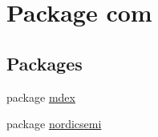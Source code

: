 \hypertarget{namespacecom}{}\section{Package com}
\label{namespacecom}
\subsection*{Packages}
\begin{DoxyCompactItemize}
\item 
package \hyperlink{namespacecom_1_1mdex}{mdex}
\item 
package \hyperlink{namespacecom_1_1nordicsemi}{nordicsemi}
\end{DoxyCompactItemize}
